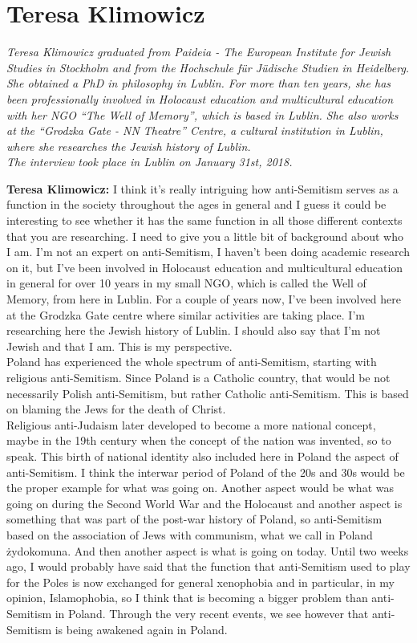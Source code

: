 \section{Teresa Klimowicz}

\textit{Teresa Klimowicz graduated from Paideia - The European Institute for Jewish Studies in Stockholm and from the Hochschule für Jüdische Studien in Heidelberg. She obtained a PhD in philosophy in Lublin. For more than ten years, she has been professionally involved in Holocaust education and multicultural education with her NGO ``The Well of Memory'', which is based in Lublin. She also works at the ``Grodzka Gate - NN Theatre'' Centre, a cultural institution in Lublin, where she researches the Jewish history of Lublin. \\ 
The interview took place in Lublin on January 31st, 2018.}\par
\vspace*{2em}
\textbf{Teresa Klimowicz:} I think it's really intriguing how anti-Semitism serves as a function in the society throughout the ages in general and I guess it could be interesting to see whether it has the same function in all those different contexts that you are researching. I need to give you a little bit of background about who I am. I'm not an expert on anti-Semitism, I haven't been doing academic research on it, but I've been involved in Holocaust education and multicultural education in general for over 10 years in my small NGO, which is called the Well of Memory, from here in Lublin. For a couple of years now, I've been involved here at the Grodzka Gate centre where similar activities are taking place. I'm researching here the Jewish history of Lublin. I should also say that I'm not Jewish and that I am. This is my perspective.\\
Poland has experienced the whole spectrum of anti-Semitism, starting with religious anti-Semitism. Since Poland is a Catholic country, that would be not necessarily Polish anti-Semitism, but rather Catholic anti-Semitism. This is based on blaming the Jews for the death of Christ.\\
Religious anti-Judaism later developed to become a more national concept, maybe in the 19th century when the concept of the nation was invented, so to speak. This birth of national identity also included here in Poland the aspect of anti-Semitism. I think the interwar period of Poland of the 20s and 30s would be the proper example for what was going on. Another aspect would be what was going on during the Second World War and the Holocaust and another aspect is something that was part of the post-war history of Poland, so anti-Semitism based on the association of Jews with communism, what we call in Poland żydokomuna. And then another aspect is what is going on today. Until two weeks ago, I would probably have said that the function that anti-Semitism used to play for the Poles is now exchanged for general xenophobia and in particular, in my opinion, Islamophobia, so I think that is becoming a bigger problem than anti-Semitism in Poland. Through the very recent events, we see however that anti-Semitism is being awakened again in Poland.  

